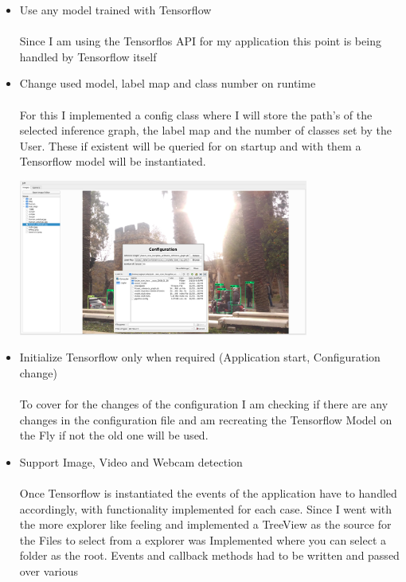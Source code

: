 \begin{itemize}
    \item Use any model trained with Tensorflow \\ \\
        Since I am using the Tensorflos API for my application this point is being handled by Tensorflow itself
    \newpage \noindent
    \item Change used model, label map and class number on runtime \\ \\
        For this I implemented a config class where I will store the path's of the selected inference graph, the label map and the
        number of classes set by the User. These if existent will be queried for on startup and with them a Tensorflow model will be instantiated.\\
        \begin{center}
            \includegraphics[width=0.75\textwidth]{images/application/application_config.png}
        \end{center}
    \item Initialize Tensorflow only when required (Application start, Configuration change)\\ \\
        To cover for the changes of the configuration I am checking if there are any changes in the configuration file and am recreating the
        Tensorflow Model on the Fly if not the old one will be used.
    \item Support Image, Video and Webcam detection \\ \\
        Once Tensorflow is instantiated the events of the application have to handled accordingly, with functionality implemented for each case.
        Since I went with the more explorer like feeling and implemented a TreeView as the source for the Files to select from a explorer
        was Implemented where you can select a folder as the root. Events and callback methods had to be written and passed over various

\end{itemize}
